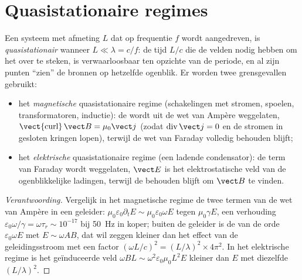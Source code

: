 \section{Quasistationaire regimes}

\begin{definition}\label{def:b2:maxwell-equations:arqs}
Een systeem met afmeting $L$ dat op frequentie $f$ wordt aangedreven, is
\emph{quasistationair} wanneer $L \ll \lambda = c/f$: de tijd $L/c$ die de
velden nodig hebben om het over te steken, is verwaarloosbaar ten opzichte
van de periode, en al zijn punten ``zien'' de bronnen op hetzelfde ogenblik.
Er worden twee grensgevallen gebruikt:
\begin{itemize}
  \item het \emph{magnetische} quasistationaire regime (schakelingen met
        stromen, spoelen, transformatoren, inductie): de 
        wordt uit de wet van Ampère weggelaten,
        $\operatorname{\vect{curl}}\vect B
        = \mu_0\vect j$ (zodat
        $\operatorname{div}\vect j = 0$ en de stromen in gesloten kringen
        lopen), terwijl de wet van Faraday volledig behouden blijft;
  \item het \emph{elektrische} quasistationaire regime (een ladende
        condensator): de term van Faraday wordt weggelaten, $\vect E$ is het
        elektrostatische veld van de ogenblikkelijke ladingen, terwijl de
         behouden blijft om $\vect B$ te vinden.
\end{itemize}
\end{definition}

\begin{proof}[Verantwoording]
Vergelijk in het magnetische regime de twee termen van de wet van Ampère in
een geleider:
$\mu_0\varepsilon_0\partial_t E \sim \mu_0\varepsilon_0\omega E$ tegen
$\mu_0\gamma E$, een verhouding
$\varepsilon_0\omega/\gamma = \omega\tau_r \sim 10^{-17}$ bij \qty{50}{Hz}
in koper; buiten de geleider is de  van de orde
$\varepsilon_0\omega E$ met $E \sim \omega AB$, dat wil zeggen kleiner dan
het effect van de geleidingsstroom met een factor
$(\omega L/c)^2 = (L/\lambda)^2 \times 4\pi^2$. In het elektrische regime is
het geïnduceerde veld $\omega BL \sim \omega^2\varepsilon_0\mu_0L^2E$
kleiner dan $E$ met diezelfde $(L/\lambda)^2$.
\end{proof}

